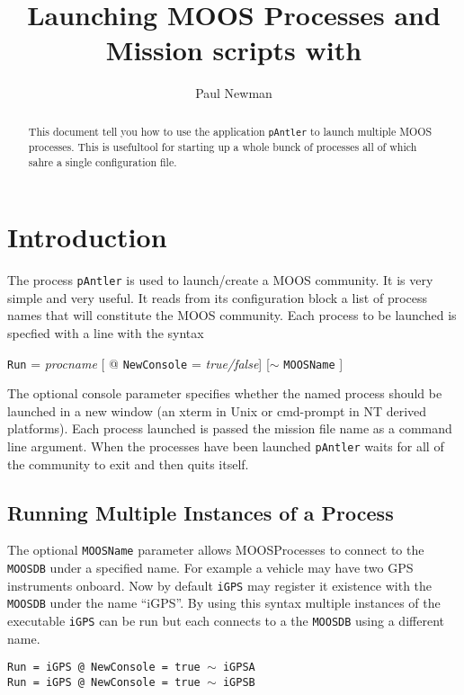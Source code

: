 \documentclass[a4paper,10pt]{article}
\title{Launching MOOS Processes and Mission scripts with \code{pAntler}}
\author{Paul Newman}
\newcommand{\Code}[1]{\texttt{#1} }
\newcommand{\code}[1]{\Code{#1} }
\newcommand{\DB}   {\code{{MOOSDB}}}
\begin{document}
\maketitle

\begin{center}
\end{center}
\begin{abstract}
This document tell you how to use the application \code{pAntler} to launch multiple MOOS processes. This is usefultool for starting up a whole bunck of processes all of which sahre a single configuration file.
\end{abstract}


\section{Introduction}
The process \code{pAntler} is used to launch/create a MOOS
community. It is very simple and very useful. It reads from its
configuration block a list of process names that will constitute
the MOOS community. Each process to be launched is specfied with a
line with the syntax
\begin{center}
{\code{Run}} = {\it{procname}} [ @ {\code{NewConsole}} =
{\it{true/false}}] [$\sim$ \code{MOOSName}]
\end{center}
The optional console parameter specifies whether the named process
should be launched in a new  window (an xterm in Unix or
cmd-prompt in NT derived platforms). Each process launched is
passed the mission file name  as a command line argument. When the
processes have been launched \code{pAntler} waits for all of the
community to exit and then quits itself.

\subsection{Running Multiple Instances of a Process}

The optional \code{MOOSName} parameter allows MOOSProcesses to
connect to the \DB under a specified name. For example a vehicle
may have two GPS instruments onboard. Now by default \code{iGPS}
may register it existence with the \DB under the name ``iGPS''. By
using this syntax multiple instances of the executable \code{iGPS}
can be run but each connects to a the \DB using a different name.

\begin{center}
\code{Run = iGPS @ NewConsole = true $\sim$ iGPSA}\\
\code{Run = iGPS @ NewConsole = true $\sim$ iGPSB}\\
\end{center}
\end{document}
